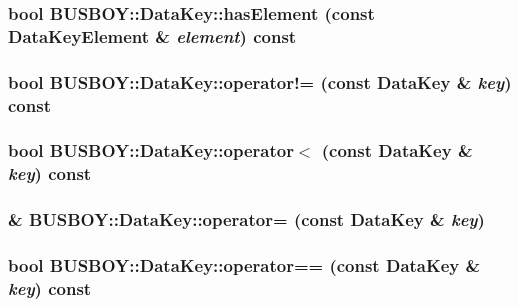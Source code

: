 \label{classBUSBOY_1_1DataKey_a8fcf134470530a671a2cb7d672bc9aed}
\hypertarget{classBUSBOY_1_1DataKey_a6852012b6e5829d7c57c3ed95635168f}{
\subsubsection[{hasElement}]{\setlength{\rightskip}{0pt plus 5cm}bool BUSBOY::DataKey::hasElement (const {\bf DataKeyElement} \& {\em element}) const}}
\label{classBUSBOY_1_1DataKey_a6852012b6e5829d7c57c3ed95635168f}
\hypertarget{classBUSBOY_1_1DataKey_a82110680c1c78066ba605c40d222e17f}{
\subsubsection[{operator!=}]{\setlength{\rightskip}{0pt plus 5cm}bool BUSBOY::DataKey::operator!= (const {\bf DataKey} \& {\em key}) const}}
\label{classBUSBOY_1_1DataKey_a82110680c1c78066ba605c40d222e17f}
\hypertarget{classBUSBOY_1_1DataKey_a5fadf3977a16c0cba0d602e2a184be52}{
\subsubsection[{operator$<$}]{\setlength{\rightskip}{0pt plus 5cm}bool BUSBOY::DataKey::operator$<$ (const {\bf DataKey} \& {\em key}) const}}
\label{classBUSBOY_1_1DataKey_a5fadf3977a16c0cba0d602e2a184be52}
\hypertarget{classBUSBOY_1_1DataKey_acf89646692118271958f38f418854d1d}{
\subsubsection[{operator=}]{ \& BUSBOY::DataKey::operator= (const {\bf DataKey} \& {\em key})}}
\label{classBUSBOY_1_1DataKey_acf89646692118271958f38f418854d1d}
\hypertarget{classBUSBOY_1_1DataKey_a4697967447ea5edb6455abfe305fdeb4}{
\subsubsection[{operator==}]{\setlength{\rightskip}{0pt plus 5cm}bool BUSBOY::DataKey::operator== (const {\bf DataKey} \& {\em key}) const}}

